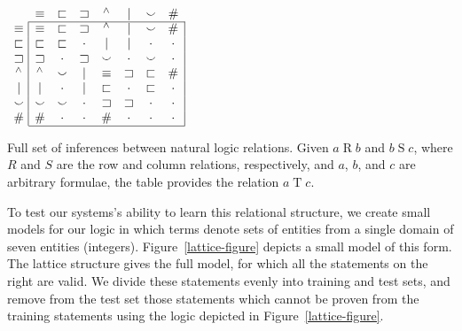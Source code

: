 \begin{table}[htp]
  \centering  
  \setlength{\arraycolsep}{8pt}
  \renewcommand{\arraystretch}{1.1}
  \newcommand{\UNK}{\cdot}  
  $\begin{array}[t]{c@{ \ }|*{7}{c}|}
    \multicolumn{1}{c}{}
             & \nateq     & \natfor     & \natrev     & \natneg    & \natalt     & \natcov     & \multicolumn{1}{c}{\natind} \\
    \cline{2-8}
    \nateq  & \nateq &   \natfor &  \natrev &  \natneg &   \natalt &  \natcov &  \natind \\
    \natfor & \natfor &  \natfor &  \UNK &  \natalt &   \natalt &  \UNK &  \UNK \\
    \natrev & \natrev &  \UNK &  \natrev &  \natcov &   \UNK &  \natcov &  \UNK \\
    \natneg & \natneg &  \natcov &  \natalt &  \nateq &    \natrev &  \natfor &  \natind \\
    \natalt & \natalt &  \UNK &  \natalt &  \natfor &   \UNK &  \natfor &  \UNK \\
    \natcov & \natcov &  \natcov &  \UNK &  \natrev &   \natrev &  \UNK &  \UNK \\
    \natind & \natind & \UNK &  \UNK &  \natind &  \UNK &  \UNK &  \UNK \\
    \cline{2-8}
  \end{array}$
  \caption{Full set of inferences between natural logic relations.
    Given $a \mathbin{R} b$ and $b \mathbin{S} c$, where $R$ and $S$
    are the row and column relations, respectively, and $a$, $b$, and
    $c$ are arbitrary formulae, the table provides the relation
    $a \mathbin{T} c$.}
  \label{tab:jointable}
\end{table}

To test our systems's ability to learn this relational structure, we
create small models for our logic in which terms denote sets of
entities from a single domain of seven entities (integers).
Figure~\ref{lattice-figure} depicts a small model of this form. The
lattice structure gives the full model, for which all the statements on
the right are valid. We divide these statements evenly into training and
test sets, and remove from the test set those statements which cannot be 
proven from the training statements using the logic depicted in 
Figure~\ref{lattice-figure}.

